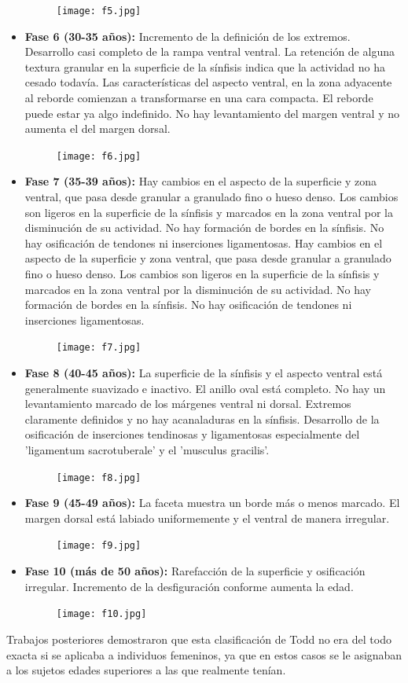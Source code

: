 \documentclass[a4paper,11pt]{article}
\begin{document}
\begin{itemize}
\begin{figure}[h!]
\centering
\texttt{[image: f5.jpg]}
\end{figure}
\item {\bf Fase 6 (30-35 años):} Incremento de la definición de los extremos. Desarrollo casi completo de la rampa ventral ventral. La retención de alguna textura granular en la superficie de la sínfisis indica que la actividad no ha cesado todavía. Las características del aspecto ventral, en la zona adyacente al reborde comienzan a transformarse en una cara compacta. El reborde puede estar ya algo indefinido. No hay levantamiento del margen ventral y no aumenta el del margen dorsal.
\begin{figure}[h!]
\centering
\texttt{[image: f6.jpg]}
\end{figure}
\item {\bf Fase 7 (35-39 años):} Hay cambios en el aspecto de la superficie y zona ventral, que pasa desde granular a granulado fino o hueso denso. Los cambios son ligeros en la superficie de la sínfisis y marcados en la zona ventral por la disminución de su actividad. No hay formación de bordes en la sínfisis. No hay osificación de tendones ni inserciones ligamentosas. Hay cambios en el aspecto de la superficie y zona ventral, que pasa desde granular a granulado fino o hueso denso. Los cambios son ligeros en la superficie de la sínfisis y marcados en la zona ventral por la disminución de su actividad. No hay formación de bordes en la sínfisis. No hay osificación de tendones ni inserciones ligamentosas.
\begin{figure}[h!]
\centering
\texttt{[image: f7.jpg]}
\end{figure}
\item {\bf Fase 8 (40-45 años):} La superficie de la sínfisis y el aspecto ventral está generalmente suavizado e inactivo. El anillo oval está completo. No hay un levantamiento marcado de los márgenes ventral ni dorsal. Extremos claramente definidos y no hay acanaladuras en la sínfisis. Desarrollo de la osificación de inserciones tendinosas y ligamentosas especialmente del 'ligamentum sacrotuberale' y el 'musculus gracilis'.
\begin{figure}[h!]
\centering
\texttt{[image: f8.jpg]}
\end{figure}
\item {\bf Fase 9 (45-49 años):} La faceta muestra un borde más o menos marcado. El margen dorsal está labiado uniformemente y el ventral de manera irregular.
\begin{figure}[h!]
\centering
\texttt{[image: f9.jpg]}
\end{figure}
\item {\bf Fase 10 (más de 50 años):} Rarefacción de la superficie y osificación irregular. Incremento de la desfiguración conforme aumenta la edad.
\begin{figure}[h!]
\centering
\texttt{[image: f10.jpg]}
\end{figure}
\end{itemize}
Trabajos posteriores demostraron que esta clasificación de Todd no era del todo exacta si se aplicaba a individuos femeninos, ya que en estos casos se le asignaban a los sujetos edades superiores a las que realmente tenían.
\end{document}
